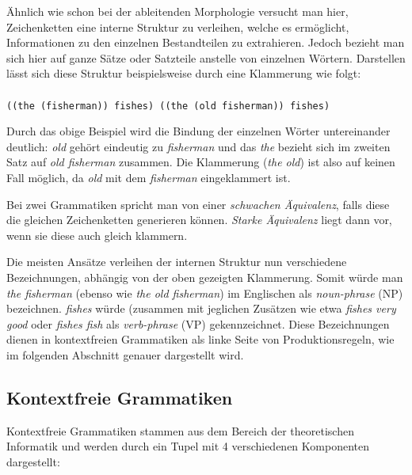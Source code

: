 \documentclass[12pt]{report}
\begin{document}
Ähnlich wie schon bei der ableitenden Morphologie versucht man hier, Zeichenketten eine interne Struktur zu verleihen, welche es ermöglicht, Informationen zu den einzelnen Bestandteilen zu extrahieren. Jedoch bezieht man sich hier auf ganze Sätze oder Satzteile anstelle von einzelnen Wörtern. Darstellen lässt sich diese Struktur beispielsweise durch eine Klammerung wie folgt:\\
\tt
\\((the (fisherman)) fishes)
((the (old fisherman)) fishes)
\\ \rm

Durch das obige Beispiel wird die Bindung der einzelnen Wörter untereinander deutlich: \textit{\glqq  old\grqq{}} gehört eindeutig zu \textit{\glqq  fisherman\grqq{}} und das \textit{\glqq  the\grqq{}} bezieht sich im zweiten Satz auf \textit{\glqq  old fisherman\grqq{}} zusammen. Die Klammerung (\textit{the old}) ist also auf keinen Fall möglich, da \textit{\glqq  old\grqq{}} mit dem \textit{\glqq  fisherman\grqq{}} eingeklammert ist. 

Bei zwei Grammatiken spricht man von einer \textit{schwachen Äquivalenz}, falls diese die gleichen Zeichenketten generieren können. \textit{Starke Äquivalenz} liegt dann vor, wenn sie diese auch gleich klammern. 

Die meisten Ansätze verleihen der internen Struktur nun verschiedene Bezeichnungen, abhängig von der oben gezeigten Klammerung. Somit würde man \textit{\glqq  the fisherman\grqq{}} (ebenso wie \textit{\glqq  the old fisherman\grqq{}}) im Englischen als \textit{\glqq  noun-phrase\grqq{}} (NP) bezeichnen. \textit{\glqq  fishes\grqq{}} würde (zusammen mit jeglichen Zusätzen wie etwa \textit{\glqq  fishes very good\grqq{}} oder \textit{\glqq  fishes fish\grqq{}} als \textit{\glqq  verb-phrase\grqq{}} (VP) gekennzeichnet. Diese Bezeichnungen dienen in kontextfreien Grammatiken als linke Seite von Produktionsregeln, wie im folgenden Abschnitt genauer dargestellt wird.

\subsection{Kontextfreie Grammatiken}
Kontextfreie Grammatiken stammen aus dem Bereich der theoretischen Informatik \cite{bw84} und werden durch ein Tupel mit 4 verschiedenen Komponenten dargestellt:
\end{document}
